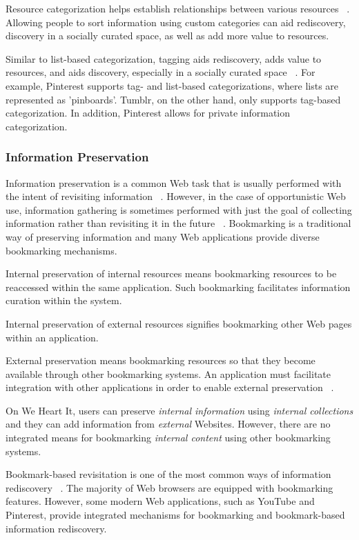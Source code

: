 {{{Resource categorization helps establish relationships between various resources ~\cite{beagrie, wittaker}. Allowing people to sort information using custom categories can aid rediscovery, discovery in a socially curated space, as well as add more value to resources.

Similar to list-based categorization, tagging aids rediscovery, adds value to resources, and aids discovery, especially in a socially curated space ~\cite{gruber}.  For example, Pinterest supports tag- and list-based categorizations, where lists are represented as 'pinboards'. Tumblr, on the other hand, only supports tag-based categorization. In addition, Pinterest allows for private information categorization.

} %

{\subsubsection{Information Preservation}
Information preservation is a common Web task that is usually performed with the intent of revisiting information ~\cite{abrams, wittaker}. However, in the case of opportunistic Web use, information gathering is sometimes performed with just the goal of collecting information rather than revisiting it in the future ~\cite{lindley}. Bookmarking is a traditional way of preserving information and many Web applications provide diverse bookmarking mechanisms. 

Internal preservation of internal resources means bookmarking resources to be reaccessed within the same application. Such bookmarking facilitates information curation within the system.

Internal preservation of external resources signifies bookmarking other Web pages within an application. 
  
External preservation means bookmarking resources so that they become available through other bookmarking systems. An application must facilitate integration with other applications in order to enable external preservation ~\cite{abrams}.

On We Heart It, users can preserve \textit{internal  information} using \textit{internal collections} and they can add information from \textit{external} Websites. However, there are no integrated means for bookmarking \textit{internal content} using other bookmarking systems.  


Bookmark-based revisitation is one of the most common ways of information rediscovery ~\cite{abrams}. The majority of Web browsers are equipped with bookmarking features. However, some modern Web applications, such as YouTube and Pinterest, provide integrated mechanisms for bookmarking and bookmark-based information rediscovery. 

}}}
